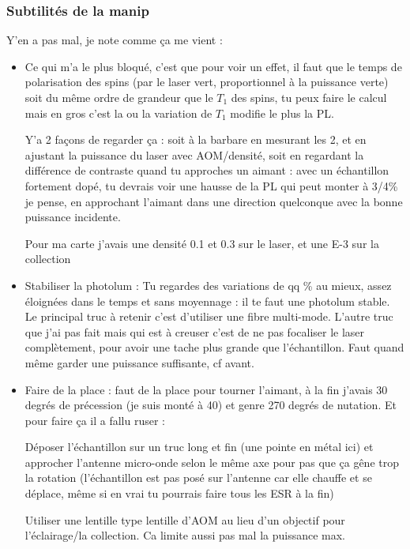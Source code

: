 \documentclass[a4paper]{report}
\begin{document}
  \subsubsection{Subtilités de la manip}
  Y'en a pas mal, je note comme ça me vient :
  \begin{itemize}
  \item Ce qui m'a le plus bloqué, c'est que pour voir un effet, il faut que le temps de polarisation des spins (par le laser vert, proportionnel à la puissance verte) soit du même ordre de grandeur que le $T_1$ des spins, tu peux faire le calcul mais en gros c'est la ou la variation de $T_1$ modifie le plus la PL.
  
  Y'a 2 façons de regarder ça : soit à la barbare en mesurant les 2, et en ajustant la puissance du laser avec AOM/densité, soit en regardant la différence de contraste quand tu approches un aimant : avec un échantillon fortement dopé, tu devrais voir une hausse de la PL qui peut monter à 3/4\% je pense, en approchant l'aimant dans une direction quelconque avec la bonne puissance incidente.
  
  Pour ma carte j'avais une densité 0.1 et 0.3 sur le laser, et une E-3 sur la collection
  
  \item Stabiliser la photolum : Tu regardes des variations de qq \% au mieux, assez éloignées dans le temps et sans moyennage : il te faut une photolum stable. Le principal truc à retenir c'est d'utiliser une fibre multi-mode. L'autre truc que j'ai pas fait mais qui est à creuser c'est de ne pas focaliser le laser complètement, pour avoir une tache plus grande que l'échantillon. Faut quand même garder une puissance suffisante, cf avant.
  
  \item Faire de la place : faut de la place pour tourner l'aimant, à la fin j'avais 30 degrés de précession (je suis monté à 40) et genre 270 degrés de nutation. Et pour faire ça il a fallu ruser : 
  
 Déposer l'échantillon sur un truc long et fin (une pointe en métal ici) et approcher l'antenne micro-onde selon le même axe pour pas que ça gêne trop la rotation (l'échantillon est pas posé sur l'antenne car elle chauffe et se déplace, même si en vrai tu pourrais faire tous les ESR à la fin)
 
 Utiliser une lentille type lentille d'AOM au lieu d'un objectif pour l'éclairage/la collection. Ca limite aussi pas mal la puissance max.
  

\end{itemize}
\end{document}
